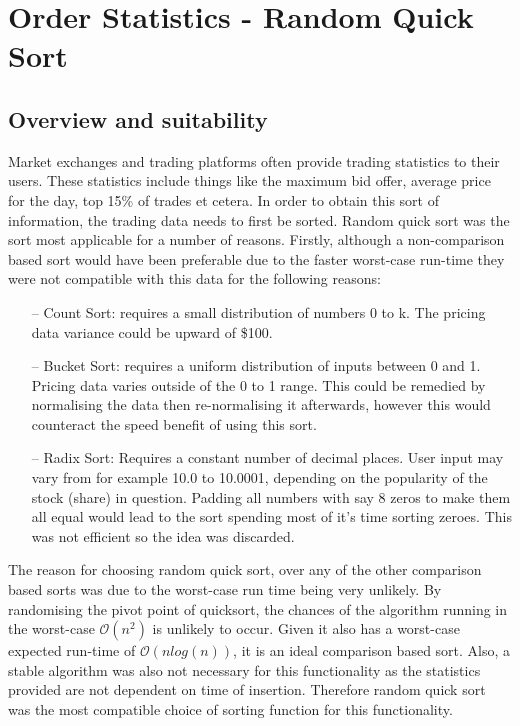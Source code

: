 \documentclass[11p]{article}
\begin{document}
\section{Order Statistics - Random Quick Sort}
\subsection{Overview and suitability}
Market exchanges and trading platforms often provide trading statistics to their users. These statistics include things like the maximum bid offer, average price for the day, top 15\% of trades et cetera. In order to obtain this sort of information, the trading data needs to first be sorted. Random quick sort was the sort most applicable for a number of reasons. Firstly, although a non-comparison based sort would have been preferable due to the faster worst-case run-time they were not compatible with this data for the following reasons:
\begin{itemize}
    \item[--] Count Sort: requires a small distribution of numbers 0 to k. The pricing data variance could be upward of \$100.
    \item[--] Bucket Sort: requires a uniform distribution of inputs between 0 and 1. Pricing data varies outside of the 0 to 1 range. This could be remedied by normalising the data then re-normalising it afterwards, however this would counteract the speed benefit of using this sort.
    \item[--] Radix Sort: Requires a constant number of decimal places. User input may vary from for example 10.0 to 10.0001, depending on the popularity of the stock (share) in question. Padding all numbers with say 8 zeros to make them all equal would lead to the sort spending most of it's time sorting zeroes. This was not efficient so the idea was discarded.
\end{itemize}
The reason for choosing random quick sort, over any of the other comparison based sorts was due to the worst-case run time being very unlikely. By randomising the pivot point of quicksort, the chances of the algorithm running in the worst-case $\mathcal{O}(n^2)$ is unlikely to occur. Given it also has a worst-case expected run-time of $\mathcal{O}(nlog(n))$, it is an ideal comparison based sort.
Also, a stable algorithm was also not necessary for this functionality as the statistics provided are not dependent on time of insertion. Therefore random quick sort was the most compatible choice of sorting function for this functionality.
\end{document}
